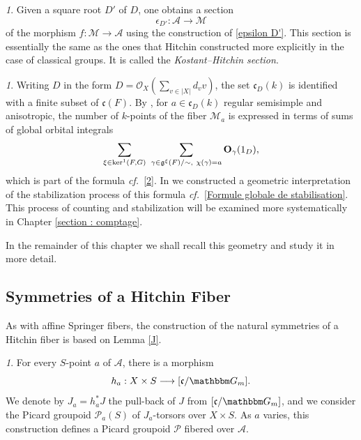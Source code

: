 \documentclass[12pt,english]{smfart}
\numberwithin{equation}{subsection}
\theoremstyle{remark}
\newtheorem{numero}[equation]{}
\newcommand\calA{{\mathscr A}}
\newcommand\calP{{\mathscr P}}
\newcommand\calM{{\mathscr M}}
\newcommand\calO{{\mathscr O}}
\newcommand\frakg{{\mathfrak g}}
\newcommand\frakc{{\mathfrak c}}
\newcommand\bfO{{\mathbf O}}
\newcommand\GG{{\mathbbm G}}
\newcommand\cf{{\it cf.\ }}
\begin{document}
\begin{numero}\label{Kostant Hitchin}
Given a square root $D'$ of $D$, one obtains a section
$$\epsilon_{D'}:\calA\longrightarrow \calM$$
of the morphism $f:\calM\longrightarrow \calA$ using the construction of \ref{epsilon D'}. This section is essentially the same as the ones that Hitchin constructed more explicitly in the case of classical groups. It is called the \emph{Kostant--Hitchin section}.
\end{numero}
\begin{numero}\label{comptage global}
Writing $D$ in the form $D=\calO_X(\sum_{v\in|X|}d_v v)$, the set $\frakc_D(k)$ is identified with a finite subset of $\frakc(F)$. By \cite[1.3]{N}, for $a\in\frakc_D(k)$ regular semisimple and anisotropic, the number of $k$-points of the fiber $\calM_a$ is expressed in terms of sums of global orbital integrals
\begin{equation}\label{comptage 4.2.6}
\sum_{\xi\in{\rm ker}^1(F,G)}\ \sum_{\gamma\in\frakg^\xi(F)/\sim,\ \chi(\gamma)=a}\bfO_\gamma(1_D),
\end{equation}
which is part of the formula \cf \ref{2}. In \cite{N} we constructed a geometric interpretation of the stabilization process of this formula \cf \ref{Formule globale de stabilisation}. This process of counting and stabilization will be examined more systematically in Chapter \ref{section : comptage}.

In the remainder of this chapter we shall recall this geometry and study it in more detail.
\end{numero}

\subsection{Symmetries of a Hitchin Fiber}
\label{subsection : symetries Hitchin}

As with affine Springer fibers, the construction of the natural symmetries of a Hitchin fiber is based on Lemma \ref{J}.

\begin{numero}
For every $S$-point $a$ of $\calA$, there is a morphism 
$$h_a: X \times S \longrightarrow [\frakc/\GG_m].$$ 
We denote by $J_a = h_a^* J$ the pull-back of $J$ from $[\frakc/\GG_m]$, and we consider the Picard groupoid $\calP_a(S)$ of $J_a$-torsors over $X \times S$. As $a$ varies, this construction defines a Picard groupoid $\calP$ fibered over $\calA$.
\end{numero}
\end{document}
